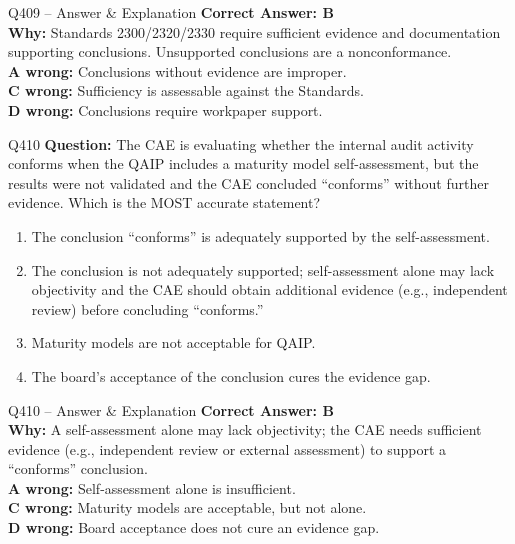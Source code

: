 \documentclass[aspectratio=169,10pt]{beamer}
\begin{document}
	\begin{frame}[t]{Q409 -- Answer \& Explanation}
		\small
		\textbf{Correct Answer: B} \\[4pt]
		\textbf{Why:} Standards 2300/2320/2330 require sufficient evidence and documentation supporting conclusions. Unsupported conclusions are a nonconformance. \\[4pt]
		\textbf{A wrong:} Conclusions without evidence are improper. \\[2pt]
		\textbf{C wrong:} Sufficiency is assessable against the Standards. \\[2pt]
		\textbf{D wrong:} Conclusions require workpaper support.
	\end{frame}
	
	\begin{frame}[t]{Q410}
		\small
		\textbf{Question:} The CAE is evaluating whether the internal audit activity conforms when the QAIP includes a maturity model self-assessment, but the results were not validated and the CAE concluded ``conforms'' without further evidence. Which is the MOST accurate statement?
		\begin{enumerate}[label=\Alph*.,itemsep=1pt,topsep=2pt]
			\item The conclusion ``conforms'' is adequately supported by the self-assessment.
			\item The conclusion is not adequately supported; self-assessment alone may lack objectivity and the CAE should obtain additional evidence (e.g., independent review) before concluding ``conforms.''
			\item Maturity models are not acceptable for QAIP.
			\item The board's acceptance of the conclusion cures the evidence gap.
		\end{enumerate}
	\end{frame}
	
	\begin{frame}[t]{Q410 -- Answer \& Explanation}
		\small
		\textbf{Correct Answer: B} \\[4pt]
		\textbf{Why:} A self-assessment alone may lack objectivity; the CAE needs sufficient evidence (e.g., independent review or external assessment) to support a ``conforms'' conclusion. \\[4pt]
		\textbf{A wrong:} Self-assessment alone is insufficient. \\[2pt]
		\textbf{C wrong:} Maturity models are acceptable, but not alone. \\[2pt]
		\textbf{D wrong:} Board acceptance does not cure an evidence gap.
	\end{frame}
	
\end{document}
